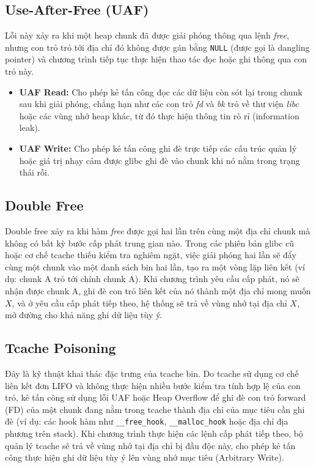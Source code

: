 \documentclass[final]{hcmuitthesis}
\begin{document}
\subsection{Use-After-Free (UAF)}
Lỗi này xảy ra khi một heap chunk đã được giải phóng thông qua lệnh \textit{free}, nhưng con trỏ trỏ tới địa chỉ đó không được gán bằng \texttt{NULL} (được gọi là dangling pointer) và chương trình tiếp tục thực hiện thao tác đọc hoặc ghi thông qua con trỏ này.
\begin{itemize}
    \item \textbf{UAF Read:} Cho phép kẻ tấn công đọc các dữ liệu còn sót lại trong chunk sau khi giải phóng, chẳng hạn như các con trỏ \textit{fd} và \textit{bk} trỏ về thư viện \textit{libc} hoặc các vùng nhớ heap khác, từ đó thực hiện thông tin rò rỉ (information leak).
    \item \textbf{UAF Write:} Cho phép kẻ tấn công ghi đè trực tiếp các cấu trúc quản lý hoặc giá trị nhạy cảm được glibc ghi đè vào chunk khi nó nằm trong trạng thái rỗi.
\end{itemize}

\subsection{Double Free}
Double free xảy ra khi hàm \textit{free} được gọi hai lần trên cùng một địa chỉ chunk mà không có bất kỳ bước cấp phát trung gian nào. 
Trong các phiên bản glibc cũ hoặc cơ chế tcache thiếu kiểm tra nghiêm ngặt, việc giải phóng hai lần sẽ đẩy cùng một chunk vào một danh sách bin hai lần, tạo ra một vòng lặp liên kết (ví dụ: chunk A trỏ tới chính chunk A). Khi chương trình yêu cầu cấp phát, nó sẽ nhận được chunk A, ghi đè con trỏ liên kết của nó thành một địa chỉ mong muốn $X$, và ở yêu cầu cấp phát tiếp theo, hệ thống sẽ trả về vùng nhớ tại địa chỉ $X$, mở đường cho khả năng ghi dữ liệu tùy ý.

\subsection{Tcache Poisoning}
Đây là kỹ thuật khai thác đặc trưng của tcache bin. Do tcache sử dụng cơ chế liên kết đơn LIFO và không thực hiện nhiều bước kiểm tra tính hợp lệ của con trỏ, kẻ tấn công sử dụng lỗi UAF hoặc Heap Overflow để ghi đè con trỏ forward (FD) của một chunk đang nằm trong tcache thành địa chỉ của mục tiêu cần ghi đè (ví dụ: các hook hàm như \texttt{\_\_free\_hook}, \texttt{\_\_malloc\_hook} hoặc địa chỉ địa phương trên stack). Khi chương trình thực hiện các lệnh cấp phát tiếp theo, bộ quản lý tcache sẽ trả về vùng nhớ tại địa chỉ bị đầu độc này, cho phép kẻ tấn công thực hiện ghi dữ liệu tùy ý lên vùng nhớ mục tiêu (Arbitrary Write).
\end{document}
